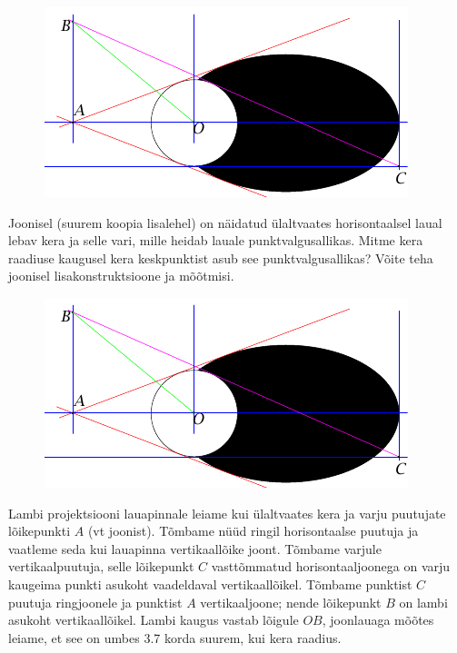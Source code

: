 
\begin{figure}
\vspace{-0.8cm}
  \begin{center}
    \includegraphics[width=1\linewidth]{2024-lahg-06-yl.pdf}
  \end{center}
  \vspace{-0.9cm}
\end{figure}

Joonisel (suurem koopia lisalehel) on näidatud ülaltvaates horisontaalsel laual lebav kera ja selle vari, mille heidab lauale punktvalgusallikas. Mitme kera raadiuse kaugusel kera keskpunktist asub see punktvalgusallikas? Võite teha joonisel lisakonstruktsioone ja mõõtmisi.




\hint

\solu
\begin{figure}[h]
    \centering
    \includegraphics[width=.7\linewidth]{2024-lahg-06-yl.pdf}
\end{figure}

Lambi projektsiooni lauapinnale leiame kui ülaltvaates kera ja varju puutujate lõikepunkti $A$ (vt joonist). Tõmbame nüüd ringil horisontaalse puutuja ja vaatleme seda kui lauapinna vertikaallõike joont. Tõmbame varjule vertikaalpuutuja, selle lõikepunkt $C$ vasttõmmatud horisontaaljoonega on varju kaugeima punkti asukoht vaadeldaval vertikaallõikel. Tõmbame punktist $C$ puutuja ringjoonele ja punktist $A$ vertikaaljoone; nende lõikepunkt $B$ on lambi asukoht vertikaallõikel. Lambi kaugus vastab lõigule $OB$, joonlauaga mõõtes leiame, et see on umbes \SI{3.7}{} korda suurem, kui kera raadius.
\probend